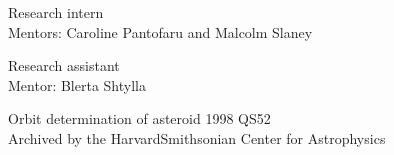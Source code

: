 
  {Research intern\\
   Mentors: Caroline Pantofaru and Malcolm Slaney}

  {Research assistant\\
   Mentor: Blerta Shtylla}

  {Orbit determination of asteroid 1998 QS52\\
   Archived by the Harvard\textendash Smithsonian Center for Astrophysics}
